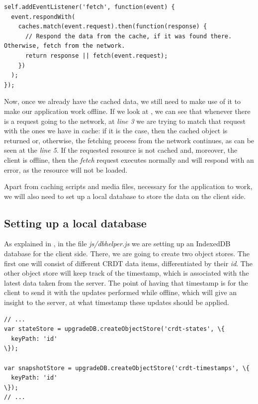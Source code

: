 \begin{lstlisting}[caption={Code for maintaining the requests of the application.}, label={lst:dev5}]
self.addEventListener('fetch', function(event) {
  event.respondWith(
    caches.match(event.request).then(function(response) {
      // Respond the data from the cache, if it was found there. Otherwise, fetch from the network.
      return response || fetch(event.request);
    })
  );
});
\end{lstlisting}

Now, once we already have the cached data, we still need to make use of it to make our application work offline. If we look at , we can see that whenever there is a request going to the network, at \textit{line 3} we are trying to match that request with the ones we have in cache: if it is the case, then the cached object is returned or, otherwise, the fetching process from the network continues, as can be seen at the \textit{line 5}. If the requested resource is not cached and, moreover, the client is offline, then the \textit{fetch} request executes normally and will respond with an error, as the resource will not be loaded.

Apart from caching scripts and media files, necessary for the application to work, we will also need to set up a local database to store the data on the client side.

\subsection*{Setting up a local database}

As explained in , in the file \textit{js/dbhelper.js} we are setting up an IndexedDB database for the client side. There, we are going to create two object stores. The first one will consist of different CRDT data items, differentiated by their \textit{id}. The other object store will keep track of the timestamp, which is associated with the latest data taken from the server. The point of having that timestamp is for the client to send it with the updates performed while offline, which will give an insight to the server, at what timestamp these updates should be applied.

\begin{lstlisting}[caption={[Creating object stores in IndexedDB]Creating object stores in IndexedDB for CRDTs and timestamps.}, label={lst:dev6}]
// ...
var stateStore = upgradeDB.createObjectStore('crdt-states', \{
  keyPath: 'id'
\});

var snapshotStore = upgradeDB.createObjectStore('crdt-timestamps', \{
  keyPath: 'id'
\});
// ...
\end{lstlisting}

